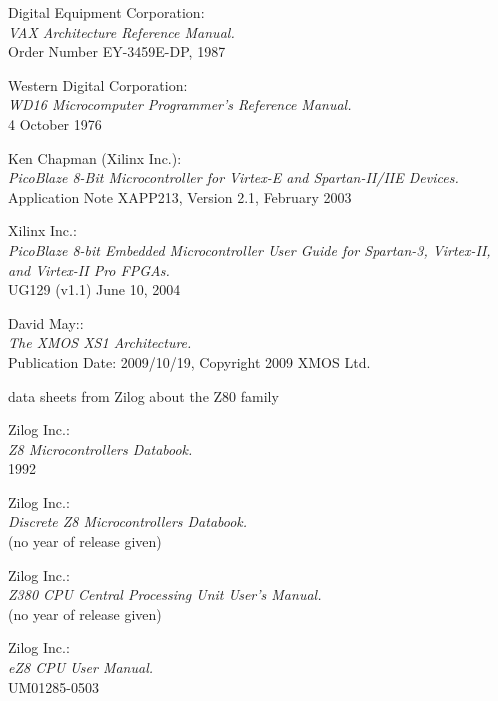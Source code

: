  Digital Equipment Corporation: \\
            {\em VAX Architecture Reference Manual.\/} \\
            Order Number EY-3459E-DP, 1987

 Western Digital Corporation: \\
            {\em WD16 Microcomputer Programmer's Reference Manual.\/} \\
            4 October 1976

 Ken Chapman (Xilinx Inc.):\\
                 {\em PicoBlaze 8-Bit Microcontroller for Virtex-E
                 and Spartan-II/IIE Devices.\/} \\
                 Application Note XAPP213, Version 2.1, February 2003

 Xilinx Inc.: \\
                 {\em PicoBlaze 8-bit Embedded Microcontroller User Guide
                 for Spartan-3, Virtex-II, and Virtex-II Pro FPGAs.\/} \\
                 UG129 (v1.1) June 10, 2004
                          
 David May:: \\
               {\em The XMOS XS1 Architecture.\/} \\
               Publication Date: 2009/10/19, Copyright 2009 XMOS Ltd.

 data sheets from Zilog about the Z80 family

 Zilog Inc.: \\
                {\em Z8 Microcontrollers Databook.\/} \\
                1992

 Zilog Inc.: \\
                  {\em Discrete Z8 Microcontrollers Databook.\/} \\
                  (no year of release given)

 Zilog Inc.: \\
                  {\em Z380 CPU Central Processing Unit User's
                  Manual.\/} \\
                  (no year of release given)

 Zilog Inc.: \\
               {\em eZ8 CPU User Manual.\/} \\
               UM01285-0503


